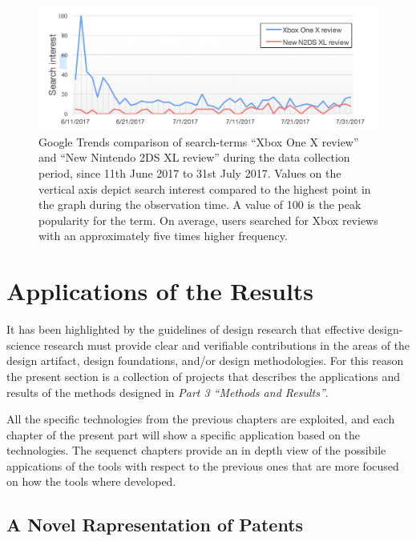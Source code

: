 \documentclass[b5paper,]{book}
\theoremstyle{definition}
\theoremstyle{definition}
\theoremstyle{definition}
\theoremstyle{remark}
\begin{document}
\begin{figure}

{\centering \includegraphics[width=1\linewidth]{_bookdown_files/figures/tweet_search_interest} 

}

\caption{Google Trends comparison of search-terms “Xbox One X review” and “New Nintendo 2DS XL review” during the data collection period, since 11th June 2017 to 31st July 2017. Values on the vertical axis depict search interest compared to the highest point in the graph during the observation time. A value of 100 is the peak popularity for the term. On average, users searched for Xbox reviews with an approximately five times higher frequency.}\label{fig:tweetsearchinterest}
\end{figure}

\part{Applications of the
Results}\label{part-applications-of-the-results}

It has been highlighted by the guidelines of design research
\citep{bichler2006design} that effective design-science research must
provide clear and verifiable contributions in the areas of the design
artifact, design foundations, and/or design methodologies. For this
reason the present section is a collection of projects that describes
the applications and results of the methods designed in \emph{Part 3
``Methods and Results''}.

All the specific technologies from the previous chapters are exploited,
and each chapter of the present part will show a specific application
based on the technologies. The sequenct chapters provide an in depth
view of the possibile appications of the tools with respect to the
previous ones that are more focused on how the tools where developed.

\chapter{A Novel Rapresentation of Patents}\label{explpatentnovel}
\end{document}
